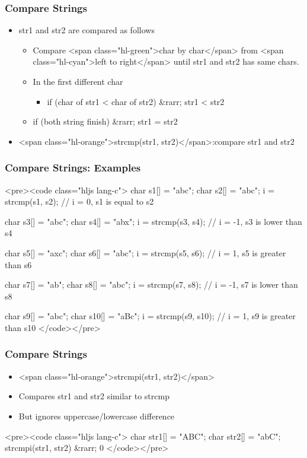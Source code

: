 \documentclass{../c-lecture}
\begin{document}
\begin{frame}
  \frametitle{Compare Strings}
  \begin{itemize}
    \item str1 and str2 are compared as follows
    \begin{itemize}
      \item
        Compare <span class="hl-green">char by char</span> from
        <span class="hl-cyan">left to right</span> until str1 and str2 has same
        chars.

      \item In the first different char
      \begin{itemize}
        \item if (char of str1 < char of str2) &rarr; str1 < str2
      \end{itemize}
      \item if (both string finish) &rarr; str1 = str2
    \end{itemize}
    \item
      <span class="hl-orange">strcmp(str1, str2)</span>:compare str1 and str2

  \end{itemize}
\end{frame}
\begin{frame}
  \frametitle{Compare Strings: Examples}
  <pre><code class="hljs lang-c">
char s1[] = "abc";
char s2[] = "abc";
i = strcmp(s1, s2); // i = 0, s1 is equal to s2

char s3[] = "abc";
char s4[] = "abx";
i = strcmp(s3, s4); // i = -1, s3 is lower than s4

char s5[] = "axc";
char s6[] = "abc";
i = strcmp(s5, s6); // i = 1, s5 is greater than s6

char s7[] = "ab";
char s8[] = "abc";
i = strcmp(s7, s8); // i = -1, s7 is lower than s8

char s9[] = "abc";
char s10[] = "aBc";
i = strcmp(s9, s10); // i = 1, s9 is greater than s10
  </code></pre>
\end{frame}
\begin{frame}
  \frametitle{Compare Strings}
  \begin{itemize}
    \item <span class="hl-orange">strcmpi(str1, str2)</span>
    \item Compares str1 and str2 similar to strcmp
    \item But ignores uppercase/lowercase difference
  \end{itemize}
  <pre><code class="hljs lang-c">
char str1[] = "ABC";
char str2[] = "abC";
strcmpi(str1, str2) &rarr; 0
  </code></pre>
\end{frame}
\end{document}
